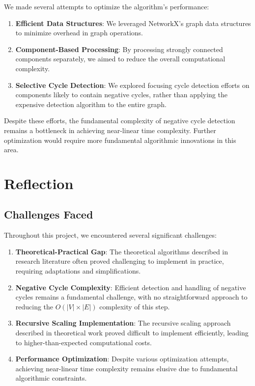 \documentclass[11pt]{article}
\begin{document}
We made several attempts to optimize the algorithm's performance:

\begin{enumerate}
    \item \textbf{Efficient Data Structures}: We leveraged NetworkX's graph data structures to minimize overhead in graph operations.
    
    \item \textbf{Component-Based Processing}: By processing strongly connected components separately, we aimed to reduce the overall computational complexity.
    
    \item \textbf{Selective Cycle Detection}: We explored focusing cycle detection efforts on components likely to contain negative cycles, rather than applying the expensive detection algorithm to the entire graph.
\end{enumerate}

Despite these efforts, the fundamental complexity of negative cycle detection remains a bottleneck in achieving near-linear time complexity. Further optimization would require more fundamental algorithmic innovations in this area.

\section{Reflection}

\subsection{Challenges Faced}

Throughout this project, we encountered several significant challenges:

\begin{enumerate}
    \item \textbf{Theoretical-Practical Gap}: The theoretical algorithms described in research literature often proved challenging to implement in practice, requiring adaptations and simplifications.
    
    \item \textbf{Negative Cycle Complexity}: Efficient detection and handling of negative cycles remains a fundamental challenge, with no straightforward approach to reducing the $O(|V| \times |E|)$ complexity of this step.
    
    \item \textbf{Recursive Scaling Implementation}: The recursive scaling approach described in theoretical work proved difficult to implement efficiently, leading to higher-than-expected computational costs.
    
    \item \textbf{Performance Optimization}: Despite various optimization attempts, achieving near-linear time complexity remains elusive due to fundamental algorithmic constraints.
\end{enumerate}
\end{document}
